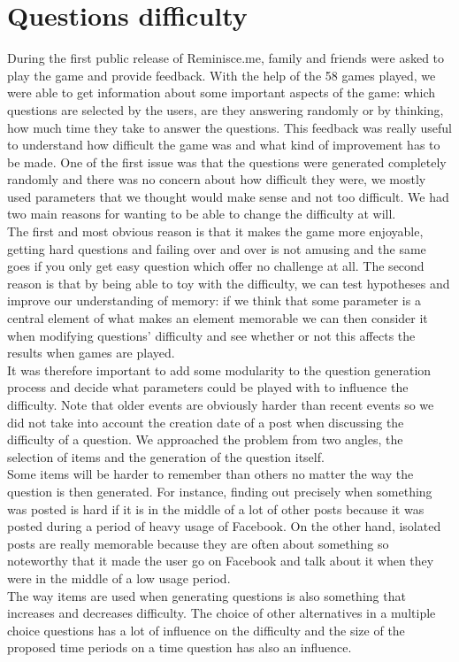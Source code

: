 \chapter{Questions difficulty}
During the first public release of Reminisce.me, family and friends were asked to play the game and provide feedback. With the help of the 58 games played, we were able to get information about some important aspects of the game: which questions are selected by the users, are they answering randomly or by thinking, how much time they take to answer the questions. This feedback was really useful to understand how difficult the game was and what kind of improvement has to be made. One of the first issue was that the questions were generated completely randomly and there was no concern about how difficult they were, we mostly used parameters that we thought would make sense and not too difficult. We had two main reasons for wanting to be able to change the difficulty at will.\\
The first and most obvious reason is that it makes the game more enjoyable, getting hard questions and failing over and over is  not amusing and the same goes if you only get easy question which offer no challenge at all. The second reason is that by being able to toy with the difficulty, we can test hypotheses and improve our understanding of memory: if we think that some parameter is a central element of what makes an element memorable we can then consider it when modifying questions' difficulty and see whether or not this affects the results when games are played.\\
It was therefore important to add some modularity to the question generation process and decide what parameters could be played with to influence the difficulty. Note that older events are obviously harder than recent events so we did not take into account the creation date of a post when discussing the difficulty of a question. We approached the problem from two angles, the selection of items and the generation of the question itself.\\
Some items will be harder to remember than others no matter the way the question is then generated. For instance, finding out precisely when something was posted is hard if it is in the middle of a lot of other posts because it was posted during a period of heavy usage of Facebook. On the other hand, isolated posts are really memorable because they are often about something so noteworthy that it made the user go on Facebook and talk about it when they were in the middle of a low usage period.\\
The way items are used when generating questions is also something that increases and decreases difficulty. The choice of other alternatives in a multiple choice questions has a lot of influence on the difficulty and the size of the proposed time periods on a time question has also an influence.

